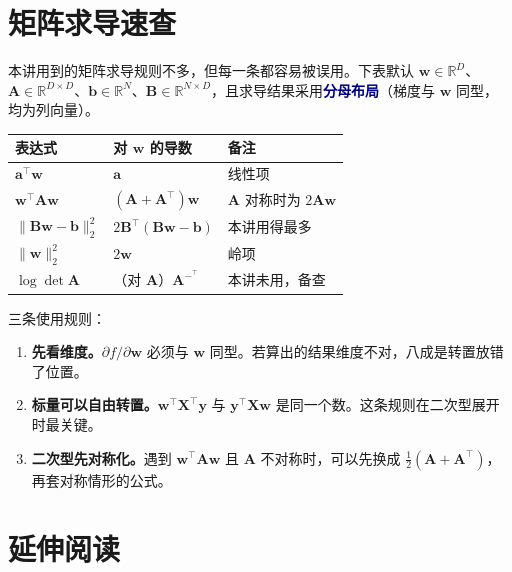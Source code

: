 \documentclass[11pt,a4paper,fontset=windows,zihao=-4]{ctexart}
\newcommand{\R}{\mathbb{R}}
\newcommand{\bX}{\mathbf{X}}
\newcommand{\by}{\mathbf{y}}
\newcommand{\bw}{\mathbf{w}}
\newcommand{\ba}{\mathbf{a}}
\newcommand{\bb}{\mathbf{b}}
\newcommand{\bA}{\mathbf{A}}
\newcommand{\bB}{\mathbf{B}}
\newcommand{\tp}{^{\top}}
\newcommand{\norm}[1]{\lVert #1\rVert}
\newcommand{\hl}[1]{\textcolor{navy}{\textbf{#1}}}
\newcommand{\tabhead}{\sffamily\bfseries\color{navy}}
\begin{document}

\appendix
\renewcommand{\thesection}{\Alph{section}}

\section{矩阵求导速查}

本讲用到的矩阵求导规则不多，但每一条都容易被误用。下表默认 $\bw\in\R^{D}$、$\bA\in\R^{D\times D}$、$\bb\in\R^{N}$、$\bB\in\R^{N\times D}$，且求导结果采用\hl{分母布局}（梯度与 $\bw$ 同型，均为列向量）。

\begin{center}
\small
\begin{tabular}{@{}lll@{}}
\toprule
\rowcolor{navy!7}
\tabhead 表达式 & \tabhead 对 $\bw$ 的导数 & \tabhead 备注\\
\midrule
$\ba\tp\bw$ & $\ba$ & 线性项\\
$\bw\tp\bA\bw$ & $(\bA+\bA\tp)\bw$ & $\bA$ 对称时为 $2\bA\bw$\\
$\norm{\bB\bw-\bb}_2^2$ & $2\bB\tp(\bB\bw-\bb)$ & 本讲用得最多\\
$\norm{\bw}_2^2$ & $2\bw$ & 岭项\\
$\log\det\bA$ & （对 $\bA$）$\bA^{-\tp}$ & 本讲未用，备查\\
\bottomrule
\end{tabular}
\end{center}

三条使用规则：

\begin{enumerate}[label=(\arabic*)]
  \item \textbf{先看维度。}$\partial f/\partial\bw$ 必须与 $\bw$ 同型。若算出的结果维度不对，八成是转置放错了位置。
  \item \textbf{标量可以自由转置。}$\bw\tp\bX\tp\by$ 与 $\by\tp\bX\bw$ 是同一个数。这条规则在二次型展开时最关键。
  \item \textbf{二次型先对称化。}遇到 $\bw\tp\bA\bw$ 且 $\bA$ 不对称时，可以先换成 $\frac{1}{2}(\bA+\bA\tp)$，再套对称情形的公式。
\end{enumerate}

\section{延伸阅读}
\end{document}

